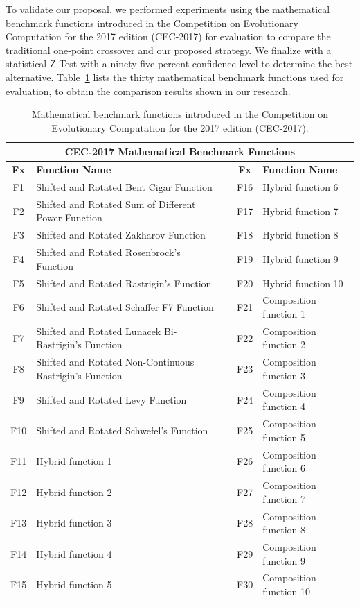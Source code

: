 \documentclass[graybox]{svmult}
\begin{document}
    To validate our proposal, we performed experiments using the mathematical benchmark functions introduced in the Competition on Evolutionary Computation for the 2017 edition (CEC-2017) for evaluation to compare the traditional one-point crossover and our proposed strategy. We finalize with a statistical Z-Test with a ninety-five percent confidence level to determine the best alternative. Table~\ref{tab.benchmark_functions} lists the thirty mathematical benchmark functions used for evaluation, to obtain the comparison results shown in our research.

    \begin{table}[]
    \scriptsize
    \centering
    \caption{Mathematical benchmark functions introduced in the Competition on Evolutionary Computation for the 2017 edition (CEC-2017).}\label{tab.benchmark_functions}    
    \begin{tabular}{@{}cllcl@{}}
    \toprule
    \multicolumn{5}{c}{\textbf{CEC-2017 Mathematical Benchmark Functions}} \\ \midrule
    \textbf{Fx} & \textbf{Function Name} &  & \textbf{Fx} & \textbf{Function Name} \\
    F1 & Shifted and Rotated   Bent Cigar Function &  & F16 & Hybrid function 6 \\
    F2 & Shifted and Rotated   Sum of Different Power Function &  & F17 & Hybrid function 7 \\
    F3 & Shifted and Rotated   Zakharov Function &  & F18 & Hybrid function 8 \\
    F4 & Shifted and Rotated   Rosenbrock's Function &  & F19 & Hybrid function 9 \\
    F5 & Shifted and Rotated   Rastrigin's Function &  & F20 & Hybrid function 10 \\
    F6 & Shifted and Rotated   Schaffer F7 Function &  & F21 & Composition function   1 \\
    F7 & Shifted and Rotated   Lunacek Bi-Rastrigin's Function &  & F22 & Composition function   2 \\
    F8 & Shifted and Rotated   Non-Continuous Rastrigin's Function &  & F23 & Composition function   3 \\
    F9 & Shifted and Rotated   Levy Function &  & F24 & Composition function   4 \\
    F10 & Shifted and Rotated   Schwefel's Function &  & F25 & Composition function   5 \\
    F11 & Hybrid function 1 &  & F26 & Composition function   6 \\
    F12 & Hybrid function 2 &  & F27 & Composition function   7 \\
    F13 & Hybrid function 3 &  & F28 & Composition function   8 \\
    F14 & Hybrid function 4 &  & F29 & Composition function   9 \\
    F15 & Hybrid function 5 &  & F30 & Composition function   10 \\ \bottomrule
    \end{tabular}
    \end{table}
\end{document}
